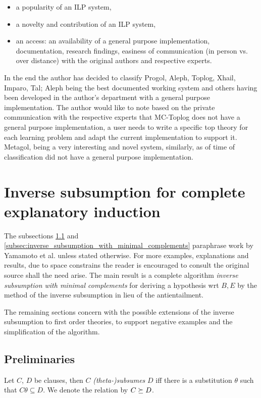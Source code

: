 \begin{itemize}
\item a popularity of an ILP system,
\item a novelty and contribution of an ILP system,
\item an access: an availability of a general purpose implementation, documentation, research findings, easiness of communication (in person vs. over distance) with the original authors and respective experts.
\end{itemize}

In the end the author has decided to classify Progol, Aleph, Toplog, Xhail, Imparo, Tal; Aleph being the best documented working system and others having been developed in the author's department with a general purpose implementation. The author would like to note based on the private communication with the respective experts that MC-Toplog does not have a general purpose implementation, a user needs to write a specific top theory for each learning problem and adapt the current implementation to support it. Metagol\cite{muggleton2014meta}, being a very interesting and novel system, similarly, as of time of classification did not have a general purpose implementation.

\section{Inverse subsumption for complete explanatory induction\cite{yamamoto2012inverse}}
The subsections \ref{subsec:preliminaries} and \ref{subsec:inverse_subsumption_with_minimal_complements} paraphrase work by Yamamoto et al. \cite{yamamoto2012inverse} unless stated otherwise. For more examples, explanations and results, due to space constrains the reader is encouraged to consult the original source shall the need arise. The main result is a complete algorithm \emph{inverse subsumption with minimal complements} for deriving a hypothesis wrt $B, E$ by the method of the inverse subsumption in lieu of the antientailment.

The remaining sections concern with the possible extensions of the inverse subsumption to first order theories, to support negative examples and the simplification of the algorithm.

\subsection{Preliminaries}\label{subsec:preliminaries}
\begin{defn}
Let $C$, $D$ be clauses, then $C$ \emph{(theta-)subsumes} $D$ iff there is a substitution $\theta$ such that $C \theta \subseteq D$. We denote the relation by $C \succeq D$.
\end{defn}

